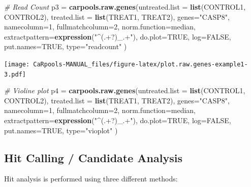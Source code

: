\documentclass[]{article}
\newenvironment{Shaded}{\begin{snugshade}}{\end{snugshade}}
\newcommand{\KeywordTok}[1]{\textcolor[rgb]{0.13,0.29,0.53}{\textbf{{#1}}}}
\newcommand{\DataTypeTok}[1]{\textcolor[rgb]{0.13,0.29,0.53}{{#1}}}
\newcommand{\DecValTok}[1]{\textcolor[rgb]{0.00,0.00,0.81}{{#1}}}
\newcommand{\StringTok}[1]{\textcolor[rgb]{0.31,0.60,0.02}{{#1}}}
\newcommand{\CommentTok}[1]{\textcolor[rgb]{0.56,0.35,0.01}{\textit{{#1}}}}
\newcommand{\OtherTok}[1]{\textcolor[rgb]{0.56,0.35,0.01}{{#1}}}
\newcommand{\NormalTok}[1]{{#1}}
\begin{document}
\begin{Shaded}
\begin{Highlighting}[]
\CommentTok{# Read Count}
\NormalTok{p3 =}\StringTok{ }\KeywordTok{carpools.raw.genes}\NormalTok{(}\DataTypeTok{untreated.list =} \KeywordTok{list}\NormalTok{(CONTROL1, CONTROL2),}
  \DataTypeTok{treated.list =} \KeywordTok{list}\NormalTok{(TREAT1, TREAT2), }\DataTypeTok{genes=}\StringTok{"CASP8"}\NormalTok{, }\DataTypeTok{namecolumn=}\DecValTok{1}\NormalTok{,}
  \DataTypeTok{fullmatchcolumn=}\DecValTok{2}\NormalTok{, }\DataTypeTok{norm.function=}\NormalTok{median, }\DataTypeTok{extractpattern=}\KeywordTok{expression}\NormalTok{(}\StringTok{"^(.+?)_.+"}\NormalTok{), }
  \DataTypeTok{do.plot=}\OtherTok{TRUE}\NormalTok{, }\DataTypeTok{log=}\OtherTok{FALSE}\NormalTok{, }\DataTypeTok{put.names=}\OtherTok{TRUE}\NormalTok{, }\DataTypeTok{type=}\StringTok{"readcount"} \NormalTok{)}
\end{Highlighting}
\end{Shaded}

\texttt{[image: CaRpools-MANUAL\_files/figure-latex/plot.raw.genes-example1-3.pdf]}

\begin{Shaded}
\begin{Highlighting}[]
\CommentTok{# Violine plot}
\NormalTok{p4 =}\StringTok{ }\KeywordTok{carpools.raw.genes}\NormalTok{(}\DataTypeTok{untreated.list =} \KeywordTok{list}\NormalTok{(CONTROL1, CONTROL2),}
  \DataTypeTok{treated.list =} \KeywordTok{list}\NormalTok{(TREAT1, TREAT2), }\DataTypeTok{genes=}\StringTok{"CASP8"}\NormalTok{, }\DataTypeTok{namecolumn=}\DecValTok{1}\NormalTok{,}
  \DataTypeTok{fullmatchcolumn=}\DecValTok{2}\NormalTok{, }\DataTypeTok{norm.function=}\NormalTok{median, }\DataTypeTok{extractpattern=}\KeywordTok{expression}\NormalTok{(}\StringTok{"^(.+?)_.+"}\NormalTok{), }
  \DataTypeTok{do.plot=}\OtherTok{TRUE}\NormalTok{, }\DataTypeTok{log=}\OtherTok{FALSE}\NormalTok{, }\DataTypeTok{put.names=}\OtherTok{TRUE}\NormalTok{, }\DataTypeTok{type=}\StringTok{"vioplot"} \NormalTok{)}
\end{Highlighting}
\end{Shaded}

\newpage

\subsection{Hit Calling / Candidate
Analysis}\label{hit-calling-candidate-analysis}

Hit analysis is performed using three different methods:
\end{document}
